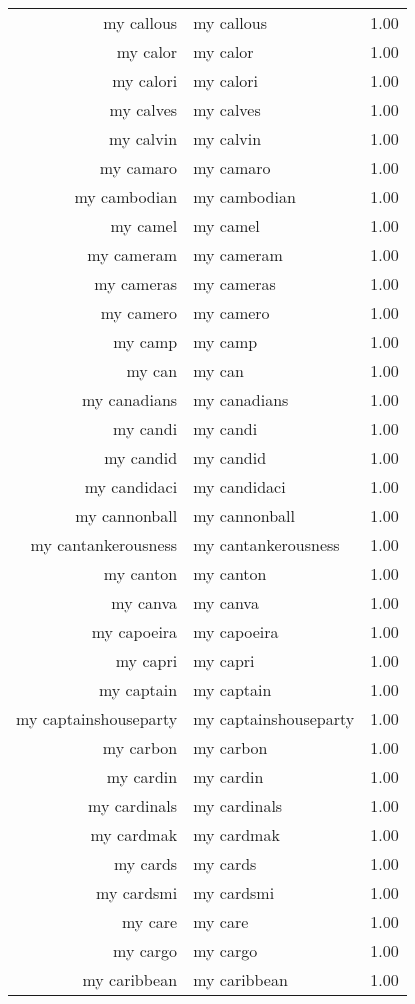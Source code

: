 \begin{table}[ht]
\begin{tabular}{rlr}
  my callous & my callous & 1.00 \\ 
  my calor & my calor & 1.00 \\ 
  my calori & my calori & 1.00 \\ 
  my calves & my calves & 1.00 \\ 
  my calvin & my calvin & 1.00 \\ 
  my camaro & my camaro & 1.00 \\ 
  my cambodian & my cambodian & 1.00 \\ 
  my camel & my camel & 1.00 \\ 
  my cameram & my cameram & 1.00 \\ 
  my cameras & my cameras & 1.00 \\ 
  my camero & my camero & 1.00 \\ 
  my camp & my camp & 1.00 \\ 
  my can & my can & 1.00 \\ 
  my canadians & my canadians & 1.00 \\ 
  my candi & my candi & 1.00 \\ 
  my candid & my candid & 1.00 \\ 
  my candidaci & my candidaci & 1.00 \\ 
  my cannonball & my cannonball & 1.00 \\ 
  my cantankerousness & my cantankerousness & 1.00 \\ 
  my canton & my canton & 1.00 \\ 
  my canva & my canva & 1.00 \\ 
  my capoeira & my capoeira & 1.00 \\ 
  my capri & my capri & 1.00 \\ 
  my captain & my captain & 1.00 \\ 
  my captainshouseparty & my captainshouseparty & 1.00 \\ 
  my carbon & my carbon & 1.00 \\ 
  my cardin & my cardin & 1.00 \\ 
  my cardinals & my cardinals & 1.00 \\ 
  my cardmak & my cardmak & 1.00 \\ 
  my cards & my cards & 1.00 \\ 
  my cardsmi & my cardsmi & 1.00 \\ 
  my care & my care & 1.00 \\ 
  my cargo & my cargo & 1.00 \\ 
  my caribbean & my caribbean & 1.00 \\ 

\end{tabular}
\end{table}
